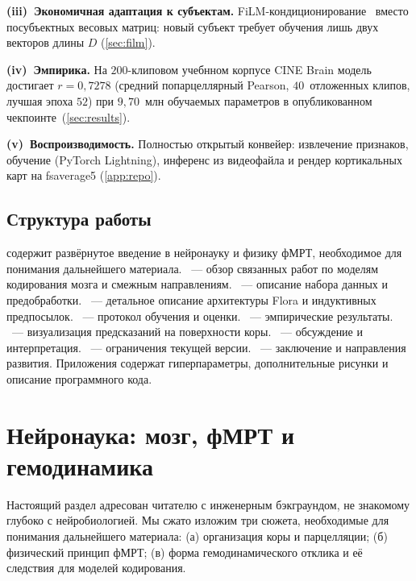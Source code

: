 \documentclass[11pt,a4paper]{article}
\begin{document}
\noindent\textbf{(iii)~Экономичная адаптация к субъектам.}
FiLM-кондиционирование~\cite{Perez2018} вместо посубъектных весовых
матриц: новый субъект требует обучения лишь двух векторов
длины $D$ (\cref{sec:film}).

\noindent\textbf{(iv)~Эмпирика.} На $200$-клиповом учебнном
корпусе CINE Brain модель достигает $r = 0{,}7278$ (средний
попарцеллярный Pearson, $40$~отложенных клипов, лучшая эпоха $52$)
при $9{,}70$~млн обучаемых параметров в опубликованном
чекпоинте~(\cref{sec:results}).

\noindent\textbf{(v)~Воспроизводимость.} Полностью открытый
конвейер: извлечение признаков, обучение (PyTorch Lightning),
инференс из видеофайла и рендер кортикальных карт на fsaverage5
(\cref{app:repo}).

\subsection{Структура работы}
\label{sec:intro-roadmap}

 содержит развёрнутое введение в нейронауку
и физику фМРТ, необходимое для понимания дальнейшего материала.
~--- обзор связанных работ по моделям кодирования
мозга и смежным направлениям. ~--- описание набора
данных и предобработки. ~--- детальное описание
архитектуры Flora и индуктивных предпосылок. ~---
протокол обучения и оценки. ~--- эмпирические
результаты. ~--- визуализация предсказаний на
поверхности коры. ~--- обсуждение и
интерпретация. ~--- ограничения текущей
версии. ~--- заключение и направления
развития. Приложения содержат гиперпараметры, дополнительные
рисунки и описание программного кода.

\section{Нейронаука: мозг, фМРТ и гемодинамика}
\label{sec:neuro}

Настоящий раздел адресован читателю с инженерным бэкграундом, не
знакомому глубоко с нейробиологией. Мы сжато изложим три сюжета,
необходимые для понимания дальнейшего материала: (а) организация
коры и парцелляции; (б) физический принцип фМРТ; (в) форма
гемодинамического отклика и её следствия для моделей кодирования.
\end{document}
